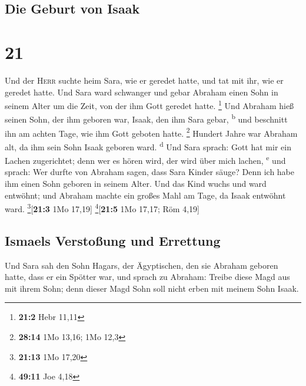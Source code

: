\hypertarget{die-geburt-von-isaak}{%
\subsection{Die Geburt von Isaak}\label{die-geburt-von-isaak}}

\hypertarget{section-20}{%
\section{21}\label{section-20}}

 Und der \textsc{Herr} suchte heim Sara, wie er geredet
hatte, und tat mit ihr, wie er geredet hatte.  Und Sara
ward schwanger und gebar Abraham einen Sohn in seinem Alter um die Zeit,
von der ihm Gott geredet hatte. \footnote{\textbf{21:2} Hebr 11,11}
 Und Abraham hieß seinen Sohn, der ihm geboren war, Isaak,
den ihm Sara gebar, \textsuperscript{b}  und beschnitt ihn
am achten Tage, wie ihm Gott geboten hatte. \footnote{\textbf{28:14} 1Mo
  13,16; 1Mo 12,3}  Hundert Jahre war Abraham alt, da ihm
sein Sohn Isaak geboren ward. \textsuperscript{d}  Und
Sara sprach: Gott hat mir ein Lachen zugerichtet; denn wer es hören
wird, der wird über mich lachen, \textsuperscript{e}  und
sprach: Wer durfte von Abraham sagen, dass Sara Kinder säuge? Denn ich
habe ihm einen Sohn geboren in seinem Alter.  Und das Kind
wuchs und ward entwöhnt; und Abraham machte ein großes Mahl am Tage, da
Isaak entwöhnt ward. \footnote{\textbf{21:13} 1Mo 17,20}{[}\textbf{21:3}
1Mo 17,19{]} \footnote{\textbf{49:11} Joe 4,18}{[}\textbf{21:5} 1Mo
17,17; Röm 4,19{]}

\hypertarget{ismaels-verstouxdfung-und-errettung}{%
\subsection{Ismaels Verstoßung und
Errettung}\label{ismaels-verstouxdfung-und-errettung}}

 Und Sara sah den Sohn Hagars, der Ägyptischen, den sie
Abraham geboren hatte, dass er ein Spötter war,  und
sprach zu Abraham: Treibe diese Magd aus mit ihrem Sohn; denn dieser
Magd Sohn soll nicht erben mit meinem Sohn Isaak.

